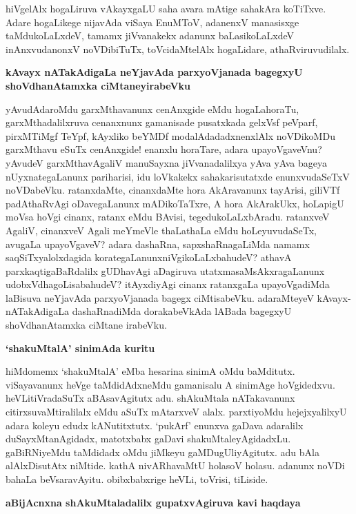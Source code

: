 \noindent
hiVgelAlx hogaLiruva vAkayxgaLU saha avara mAtige sahakAra koTiTxve. Adare hogaLikege nija\-vAda viSaya EnuMToV, adanenxV manasisxge taMdukoLaLxdeV, tamamx jiVvanakekx adanunx baLasikoLaLxdeV inAnxvu\-danonxV noVDibiTuTx, toVcidaMtelAlx hogaLidare, athaRviruvudilalx.

{\bigskip
\noindent
{\large\bf kAvayx nATakAdigaLa neYjavAda parxyoVjanada bagegxyU shoVdhanAtamxka ciMtaneyirabeVku}}\label{page250}
\medskip

\noindent
yAvudAdaroMdu garxMthavanunx cenAnxgide eMdu hogaLahoraTu, garxMthadalilxruva cenanxnunx gama\-nisade pusatxkada gelxVsf peVparf, pirxMTiMgf TeYpf, kAyxliko beYMDf modalAdadadxnenxlAlx noVDi\-koMDu garxMthavu eSuTx cenAnxgide! enanxlu horaTare, adara upayoVgaveVnu? yAvudeV garxMtha\-vAgaliV manuSayxna jiVvanadalilxya yAva yAva bageya nUyxnategaLanunx pariharisi, idu loVkakekx saha\-karisu\-tatxde enunxvudaSeTxV noVDabeVku. ratanxdaMte, cinanxdaMte hora AkAravanunx tayArisi, giliVTf padAthaR\-vAgi oDavegaLanunx mADikoTaTxre, A hora AkArakUkx, hoLa\-pigU moVsa hoVgi cinanx, ratanx eMdu BAvisi, tegedukoLaLxbAradu. ratanxveV AgaliV, cinanxveV Agali meYmeVle thaLathaLa eMdu hoLeyuvu\-daSeTx, avugaLa upa\-yoVgaveV? adara dashaRna, sapxshaRnagaLiMda namamx saqSiTxyalolxdagida korate\-gaLanunx\break niVgikoLaLxbahudeV? athavA parxkaqtigaBaRdalilx gUDhavAgi aDagiruva utatxma\break saMsAkxra\-gaLanunx udobxVdha\-goLisabahudeV? itAyxdiyAgi cinanx ratanxgaLa upa\break\-yoVga\-diMda laBisuva neYjavAda parxyoVjanada bagegx ciMtisabeVku. adaraMteyeV kAvayx-nATakAdigaLa dashaRnadiMda dorakabeVkAda lABada bagegxyU shoVdha\-nAtamxka ciMtane irabeVku.

{\bigskip
\noindent
{\large\bf `shakuMtalA' sinimAda kuritu}}\label{page234}
\medskip

\noindent
hiMdomemx `shakuMtalA' eMba hesarina sinimA oMdu baMditutx. viSayavanunx heVge taMdidAdxneMdu gamanisalu A sinimAge hoVgidedxvu. heVLitiVradaSuTx aBAsavAgitutx adu. shAkuMtala nATakavanunx citirxsuvaMtiralilalx eMdu aSuTx mAtarxveV alalx. parxtiyoMdu hejejxyalilxyU adara koleyu edudx kANutitxtutx. `pukArf' enunxva gaDava adaralilx duSayxMtanAgidadx, matotxbabx gaDavi shakuMtaleyAgi\-dadxLu. gaBiRNiyeMdu taMdidadx oMdu jiMkeyu gaMDugUliyAgitutx. adu bAla alAlxDisutAtx niMtide. kathA nivARhavaMtU holasoV holasu. adanunx noVDi bahaLa beVsaravAyitu. obibxbabxrige heVLi, toVrisi, tiLiside.

{\bigskip
\noindent
{\large\bf aBijAcnxna shAkuMtaladalilx gupatxvAgiruva kavi haqdaya}}\label{page234}
\medskip

